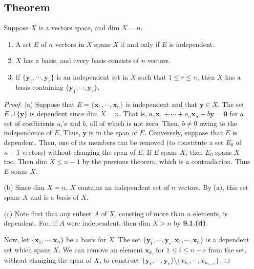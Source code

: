 \documentclass{article}
\renewcommand\dim{\ensuremath{\text{dim }}}
\newcommand\bx{\ensuremath{\boldsymbol x}}
\newcommand\by{\ensuremath{\boldsymbol y}}
\newcommand\bzero{\ensuremath{\boldsymbol 0}}
\begin{document}
%
\subsection{Theorem}
Suppose \(X\) is a vectors space, and \(\dim X = n\).
\begin{enumerate}[label=(\alph*)]
\item
A set \(E\) of \(n\) vectors in \(X\) spans \(X\) if and only if \(E\) is independent.
\item
\(X\) has a basis, and every basis consists of \(n\) vectors.
\item
If \(\{\by_1,\cdots,\by_r\}\) is an independent set in \(X\) such that \(1\le r\le n\), then \(X\) has a basis containing \(\{\by_1,\cdots,\by_r\}\).
\end{enumerate}

\begin{proof}
(a)
Suppose that \(E=\{\bx_1,\cdots,\bx_n\}\) is independent and that \(\by\in X\).
The set \(E\cup\{\by\}\) is dependent since \(\dim X =n\).
That is, \(a_1\bx_1+\cdots+a_n\bx_n+b\by=\bzero\) for a set of coefficients \(a_i\)'s and \(b\), all of which is not zero.
Then, \(b\ne0\) owing to the independence of \(E\).
Thus, \(\by\) is in the span of \(E\).
Conversely, suppose that \(E\) is dependent.
Then, one of its members can be removed (to constitute a set \(E_0\) of \(n-1\) vectors) without changing the span of \(E\).
If \(E\) spans \(X\), then \(E_0\) spans \(X\) too.
Then \(\dim X\le n-1\) by the previous theorem, which is a contradiction.
Thus \(E\) spans \(X\).

(b)
Since \(\dim X = n\), \(X\) contains an independent set of \(n\) vectors.
By (a), this set spans \(X\) and is a basis of \(X\).

(c)
Note first that any subset \(A\) of \(X\), consting of more than \(n\) elements, is dependent.
For, if \(A\) were independent, then \(\dim X>n\) by \textbf{9.1.(d)}.

Now, let \(\{\bx_1,\cdots,\bx_n\}\) be a basis for \(X\).
The set \(\{\by_1,\cdots,\by_r,\bx_1,\cdots,\bx_n\}\) is a dependent set which spans \(X\).
We can remove an element \(\bx_{k_i}\) for \(1\le i\le n-r\) from the set, without changing the span of \(X\), to construct \(\{\by_1,\cdots,\by_r\}\setminus\{x_{k_1},\cdots,x_{k_{n-r}}\}\).


\end{proof}
\end{document}
